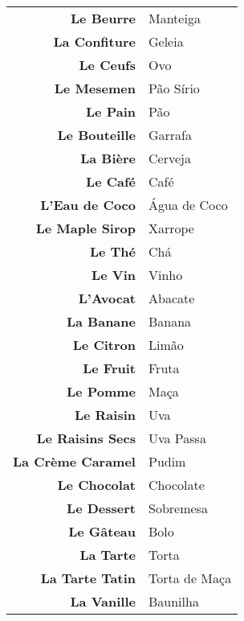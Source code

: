 \documentclass{article}
\begin{document}
        \begin{center}
            \begin{tabular}{r l}
                \textbf{Le Beurre}    & Manteiga\\ 
                \textbf{La Confiture} & Geleia\\ 
                \textbf{Le Ceufs}     & Ovo\\ 
                \textbf{Le Mesemen}   & Pão Sírio\\ 
                \textbf{Le Pain}      & Pão\\[2.5ex]
                
                \textbf{Le Bouteille}   & Garrafa\\
                \textbf{La Bière}       & Cerveja\\
                \textbf{Le Café}        & Café\\
                \textbf{L'Eau de Coco}  & Água de Coco\\
                \textbf{Le Maple Sirop} & Xarrope\\
                \textbf{Le Thé}         & Chá\\
                \textbf{Le Vin}         & Vinho\\[2.5ex]

                \textbf{L'Avocat}        & Abacate\\
                \textbf{La Banane}       & Banana\\
                \textbf{Le Citron}       & Limão\\
                \textbf{Le Fruit}        & Fruta\\
                \textbf{Le Pomme}        & Maça\\
                \textbf{Le Raisin}       & Uva\\
                \textbf{Le Raisins Secs} & Uva Passa\\[2.5ex]
                                         
                \textbf{La Crème Caramel} & Pudim\\
                \textbf{Le Chocolat}      & Chocolate\\
                \textbf{Le Dessert}       & Sobremesa\\
                \textbf{Le Gâteau}        & Bolo\\
                \textbf{La Tarte}         & Torta\\
                \textbf{La Tarte Tatin}   & Torta de Maça\\
                \textbf{La Vanille}       & Baunilha\\[2.5ex]
                

\end{tabular}
\end{center}
\end{document}
